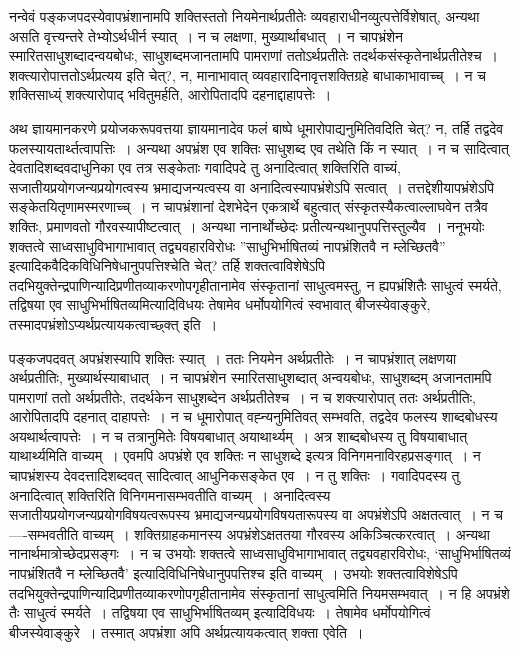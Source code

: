			\begin{small}
			
				नन्वेवं पङ्कजपदस्येवापभ्रंशानामपि शक्तिस्ततो नियमेनार्थप्रतीतेः व्यवहाराधीनव्युत्पत्तेर्विशेषात्, अन्यथा असति वृत्त्यन्तरे तेभ्योऽर्थधीर्न स्यात्~। न च लक्षणा, मुख्यार्थाबधात्~। न चापभ्रंशेन स्मारितसाधुशब्दादन्वयबोधः, साधुशब्दमजानतामपि पामराणां ततोऽर्थप्रतीतेः तदर्थकसंस्कृतेनार्थप्रतीतेश्च~। शक्त्यारोपात्ततोऽर्थप्रत्यय इति चेत्?, न, मानाभावात् व्यवहारादिनावृत्तशक्तिग्रहे बाधाकाभावाच्च्~। न च शक्तिसाध्य्ं शक्त्यारोपाद् भवितुमर्हति, आरोपितादपि दहनाद्दाहापत्तेः~।
  
				अथ ज्ञायमानकरणे प्रयोजकरूपवत्तया ज्ञायमानादेव फलं बाष्पे धूमारोपाद्यनुमितिवदिति चेत्? न, तर्हि तद्वदेव फलस्यायतार्थ्तत्वापत्तिः~। अन्यथा अपभ्रंश एव शक्तिः साधुशब्द एव तथेति किं न स्यात्~। न च सादित्वात् देवतादिशब्दवदाधुनिका एव तत्र सङ्केताः गवादिपदे तु अनादित्वात् शक्तिरिति वाच्यं, सजातीयप्रयोगजन्यप्रयोगत्वस्य भ्रमाद्यजन्यत्वस्य वा अनादित्वस्यापभ्रंशेऽपि सत्वात्~। तत्तद्देशीयापभ्रंशेऽपि सङ्केतयितृणामस्मरणाच्च्~। न चापभ्रंशानां देशभेदेन एकत्रार्थे बहुत्वात् संस्कृतस्यैकत्वाल्लाघवेन तत्रैव शक्तिः, प्रमाणवतो गौरवस्यापीष्टत्वात्~। अन्यथा नानार्थोच्छेदः प्रतीत्यन्यथानुपपत्तिस्तुल्यैव~। ननूभयोः शक्तत्वे साध्वसाधुविभागाभावात् तद्व्यवहारविरोधः ”साधुभिर्भाषितव्यं नापभ्रंशितवै न म्लेच्छितवै” इत्यादिकवैदिकविधिनिषेधानुपपत्तिश्चेति चेत्? तर्हि शक्तत्वाविशेषेऽपि तदभियुक्तेन्द्रपाणिन्यादिप्रणीतव्याकरणोपगृहीतानामेव संस्कृतानां साधुत्वमस्तु, न ह्यपभ्रंशितैः साधुत्वं स्मर्यते, तद्विषया एव साधुभिर्भाषितव्यमित्यादिविधयः तेषामेव धर्मोपयोगित्वं स्वभावात् बीजस्येवाङ्कुरे, तस्मादपभ्रंशोऽप्यर्थप्रत्यायकत्वाच्छ्क्त् इति~।
			\end{small}

			पङ्कजपदवत् अपभ्रंशस्यापि शक्तिः स्यात्~। ततः नियमेन अर्थप्रतीतेः~। न चापभ्रंशात् लक्षणया अर्थप्रतीतिः, मुख्यार्थस्याबाधात्~। न चापभ्रंशेन स्मारितसाधुशब्दात् अन्वयबोधः, साधुशब्दम् अजानतामपि पामराणां ततो अर्थप्रतीतेः, तदर्थकेन साधुशब्देन अर्थप्रतीतेश्च~। न च शक्त्यारोपात् ततः अर्थप्रतीतिः, आरोपितादपि दहनात्  दाहापत्तेः~। न च धूमारोपात् वह्न्यनुमितिवत् सम्भवति, तद्वदेव फलस्य शाब्दबोधस्य अयथार्थत्वापत्तेः~। न च तत्रानुमितेः विषयबाधात् अयाथार्थ्यम्~। अत्र शाब्दबोधस्य तु विषयाबाधात् याथार्थ्यमिति वाच्यम्~। एवमपि अपभ्रंशे एव शक्तिः न साधुशब्दे इत्यत्र विनिगमनाविरहप्रसङ्गात्~। न चापभ्रंशस्य देवदत्तादिशब्दवत् सादित्वात् आधुनिकसङ्केत एव~। न तु शक्तिः~। गवादिपदस्य तु अनादित्वात् शक्तिरिति विनिगमनासम्भवतीति वाच्यम्~। अनादित्वस्य सजातीयप्रयोगजन्यप्रयोगविषयत्वरूपस्य भ्रमाद्यजन्यप्रयोगविषयतारूपस्य वा अपभ्रंशेऽपि अक्षतत्वात्~। न च ----सम्भवतीति वाच्यम्~। शक्तिग्राहकमानस्य अपभ्रंशेऽक्षततया गौरवस्य अकिञ्चित्करत्वात्~। अन्यथा नानार्थमात्रोच्छेदप्रसङ्गः~।  न च उभयोः शक्तत्वे साध्वसाधुविभागाभावात् तद्व्यवहारविरोधः, ‘साधुभिर्भाषितव्यं नापभ्रंशितवै न म्लेच्छितवै’ इत्यादिविधिनिषेधानुपपत्तिश्च इति वाच्यम्~। उभयोः शक्तत्वाविशेषेऽपि तदभियुक्तेन्द्रपाणिन्यादिप्रणीतव्याकरणोपगृहीतानामेव संस्कृतानां साधुत्वमिति नियमसम्भवात्~। न हि अपभ्रंशे तैः साधुत्वं स्मर्यते~। तद्विषया एव साधुभिर्भाषितव्यम् इत्यादिविधयः~। तेषामेव धर्मोपयोगित्वं बीजस्येवाङ्कुरे~। तस्मात् अपभ्रंशा अपि अर्थप्रत्यायकत्वात् शक्ता एवेति~। 


